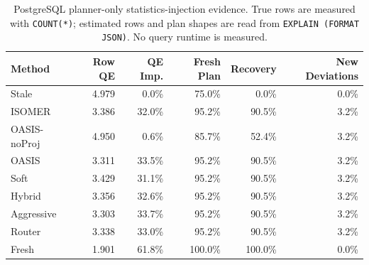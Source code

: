 \begin{table}[t]
  \centering
  \small
  \caption{PostgreSQL planner-only statistics-injection evidence. True rows are measured with \texttt{COUNT(*)}; estimated rows and plan shapes are read from \texttt{EXPLAIN (FORMAT JSON)}. No query runtime is measured.}
  \label{tab:postgres_planner_stats_injection}
  \setlength{\tabcolsep}{4pt}
  \begin{tabular}{lrrrrr}
    \toprule
    Method & Row QE & QE Imp. & Fresh Plan & Recovery & New Deviations \\
    \midrule
    Stale & 4.979 & 0.0\% & 75.0\% & 0.0\% & 0.0\% \\
    ISOMER & 3.386 & 32.0\% & 95.2\% & 90.5\% & 3.2\% \\
    OASIS-noProj & 4.950 & 0.6\% & 85.7\% & 52.4\% & 3.2\% \\
    OASIS & 3.311 & 33.5\% & 95.2\% & 90.5\% & 3.2\% \\
    Soft & 3.429 & 31.1\% & 95.2\% & 90.5\% & 3.2\% \\
    Hybrid & 3.356 & 32.6\% & 95.2\% & 90.5\% & 3.2\% \\
    Aggressive & 3.303 & 33.7\% & 95.2\% & 90.5\% & 3.2\% \\
    Router & 3.338 & 33.0\% & 95.2\% & 90.5\% & 3.2\% \\
    Fresh & 1.901 & 61.8\% & 100.0\% & 100.0\% & 0.0\% \\
    \bottomrule
  \end{tabular}
\end{table}

